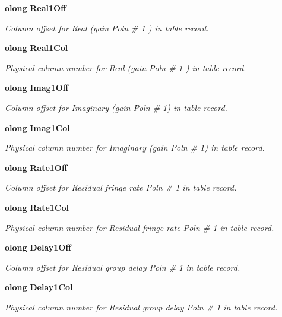 \begin{CompactItemize}
{\bf olong} {\bf Real1Off}
\begin{CompactList}\small\item\em Column offset for Real (gain Poln \# 1 ) in table record. \item\end{CompactList}\item 
{\bf olong} {\bf Real1Col}
\begin{CompactList}\small\item\em Physical column number for Real (gain Poln \# 1 ) in table record. \item\end{CompactList}\item 
{\bf olong} {\bf Imag1Off}
\begin{CompactList}\small\item\em Column offset for Imaginary (gain Poln \# 1) in table record. \item\end{CompactList}\item 
{\bf olong} {\bf Imag1Col}
\begin{CompactList}\small\item\em Physical column number for Imaginary (gain Poln \# 1) in table record. \item\end{CompactList}\item 
{\bf olong} {\bf Rate1Off}
\begin{CompactList}\small\item\em Column offset for Residual fringe rate Poln \# 1 in table record. \item\end{CompactList}\item 
{\bf olong} {\bf Rate1Col}
\begin{CompactList}\small\item\em Physical column number for Residual fringe rate Poln \# 1 in table record. \item\end{CompactList}\item 
{\bf olong} {\bf Delay1Off}
\begin{CompactList}\small\item\em Column offset for Residual group delay Poln \# 1 in table record. \item\end{CompactList}\item 
{\bf olong} {\bf Delay1Col}
\begin{CompactList}\small\item\em Physical column number for Residual group delay Poln \# 1 in table record. \item\end{CompactList}\item 

\end{CompactItemize}
